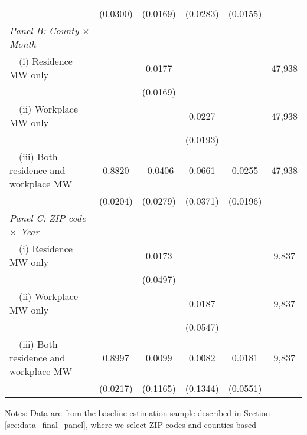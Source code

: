\begin{landscape}
\begin{table}[ht!]
{\begin{tabular}{@{}lccccc@{}}
                                                             & (0.0300) & (0.0169) & (0.0283) & (0.0155) &      \\
        \textit{Panel B: County $\times$ Month}              &       &       &       &       &      \\
        $\quad$(i) Residence MW only                         &       &  0.0177  &       &       & 47,938 \\
                                                             &       & (0.0169) &       &       &      \\
        $\quad$(ii) Workplace MW only                        &       &       &  0.0227  &       & 47,938 \\
                                                             &       &       & (0.0193) &       &      \\
        $\quad$(iii) Both residence and workplace MW         &  0.8820  &  -0.0406  &  0.0661  &  0.0255  & 47,938 \\
                                                             & (0.0204) & (0.0279) & (0.0371) & (0.0196) &      \\
        \textit{Panel C: ZIP code $\times$ Year}             &       &       &       &       &      \\
        $\quad$(i) Residence MW only                         &       &  0.0173  &       &       & 9,837 \\
                                                             &       & (0.0497) &       &       &      \\
        $\quad$(ii) Workplace MW only                        &       &       &  0.0187  &       & 9,837 \\
                                                             &       &       & (0.0547) &       &      \\
        $\quad$(iii) Both residence and workplace MW         &  0.8997  &  0.0099  &  0.0082  &  0.0181  & 9,837 \\
                                                             & (0.0217) & (0.1165) & (0.1344) & (0.0551) &      \\ \bottomrule
    \end{tabular}
    }
    \begin{minipage}{.95\linewidth} \scriptsize
        \vspace{2mm}
        Notes:
        Data are from the baseline estimation sample described in Section 
        \ref{sec:data_final_panel}, where we select ZIP codes and counties based 

\end{minipage}
\end{table}
\end{landscape}
